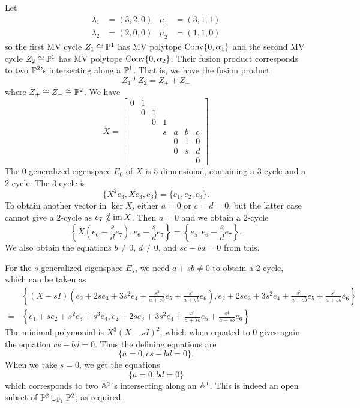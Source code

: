\documentclass{article}
\begin{document}
\begin{example}
    Let
    \[
    \begin{aligned}
        \lambda_1 &= (3,2,0) & \mu_1 &= (3,1,1) \\
        \lambda_2 &= (2,0,0) & \mu_2 &= (1,1,0)
    \end{aligned}
    \]
    so the first MV cycle $Z_1 \cong \PP^1$ has MV polytope $\Conv\{0, \alpha_1\}$ and the second MV cycle $Z_2 \cong \PP^1$ has MV polytope $\Conv\{0, \alpha_2\}$. Their fusion product corresponds to two $\PP^2$'s intersecting along a $\PP^1$. That is, we have the fusion product
    \[
    Z_1 * Z_2 = Z_+ + Z_-
    \]
    where $Z_+ \cong Z_- \cong \PP^2$.
    We have 
    \[
    X = \begin{bmatrix}
    0 & 1 \\
      & 0 & 1 \\
      &   & 0 & 1 \\
      &   &   & s & a & b & c \\
      &   &   &   & 0 & 1 & 0 \\
      &   &   &   & 0 & s & d \\
      &   &   &   &   &   & 0
    \end{bmatrix}
    \]
    The $0$-generalized eigenspace $E_0$ of $X$ is $5$-dimensional, containing a 3-cycle and a 2-cycle.
    The 3-cycle is 
    \[
    \{X^2 e_3 , X e_3, e_3\} = \{e_1, e_2, e_3\}.
    \]
    To obtain another vector in $\ker X$, either $a = 0$ or $c = d = 0$, but the latter case cannot give a 2-cycle as $e_7 \notin \im X$. Then $a = 0$ and we obtain a 2-cycle
    \[
    \left\{X \left( e_6 -\frac{s}{d}e_7 \right), e_6 - \frac{s}{d}e_7 \right\}
    = \left\{e_5, e_6 - \frac{s}{d}e_7 \right\}.
    \]
    We also obtain the equations $b \neq 0$, $d \neq 0$, and $sc - bd = 0$ from this.
    
    For the $s$-generalized eigenspace $E_s$, we need $a + sb \neq 0$ to obtain a 2-cycle, which can be taken as 
    \[
    \begin{split}
    & \left\{ 
    (X -sI) \left( e_2 + 2s e_3 + 3s^2 e_4 + \frac{s^3}{a+sb} e_5 + \frac{s^4}{a+sb} e_6 \right), 
    e_2 + 2s e_3 + 3s^2 e_4 + \frac{s^3}{a+sb} e_5 + \frac{s^4}{a+sb} e_6 
    \right\} \\
    = & \left\{ 
    e_1 + s e_2 + s^2 e_3 + s^3 e_4, 
    e_2 + 2s e_3 + 3s^2 e_4 + \frac{s^3}{a+sb} e_5 + \frac{s^4}{a+sb} e_6
    \right\}
    \end{split}
    \]
    The minimal polymonial is $X^3 (X-sI)^2$, which when equated to 0 gives again the equation $cs-bd = 0$.
    Thus the defining equations are 
    \[
    \{ a = 0, cs-bd = 0\}.
    \]
    When we take $s = 0$, we get the equations
    \[
    \{a = 0, bd = 0\}
    \]
    which corresponds to two $\AA^2$'s intersecting along an $\AA^1$. This is indeed an open subset of $\PP^2 \cup_{\PP_1} \PP^2$, as required.
\end{example}
\end{document}
